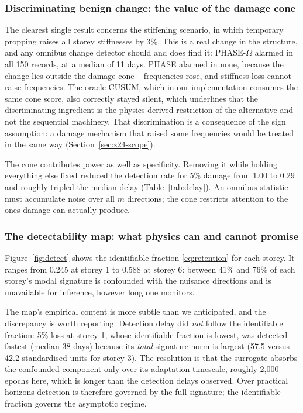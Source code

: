 \documentclass[12pt,a4paper]{article}
\newcommand{\rev}[1]{#1}
\newcommand{\rev}[1]{{\color{revcol}#1}}
\begin{document}
\subsubsection{Discriminating benign change: the value of the damage cone}\label{sec:res-cone}

The clearest single result concerns the stiffening scenario, in which temporary propping raises all storey stiffnesses by 3\%. This is a real change in the structure, and any omnibus change detector should and does find it: PHASE-$\Omega$ alarmed in all 150 records, at a median of 11 days. PHASE alarmed in none, because the change lies outside the damage cone -- frequencies rose, and stiffness loss cannot raise frequencies. The oracle CUSUM, which in our implementation consumes the same cone score, also correctly stayed silent, which underlines that the discriminating ingredient is the physics-derived restriction of the alternative and not the sequential machinery. \rev{That discrimination is a consequence of the sign assumption: a damage mechanism that raised some frequencies would be treated in the same way (Section~\ref{sec:z24-scope}).}

The cone contributes power as well as specificity. Removing it while holding everything else fixed reduced the detection rate for 5\% damage from 1.00 to 0.29 and roughly tripled the median delay (Table~\ref{tab:delay}). An omnibus statistic must accumulate noise over all $m$ directions; the cone restricts attention to the ones damage can actually produce.

\subsubsection{The detectability map: what physics can and cannot promise}\label{sec:res-detect}

Figure~\ref{fig:detect} shows the identifiable fraction \eqref{eq:retention} for each storey. It ranges from 0.245 at storey 1 to 0.588 at storey 6: between 41\% and 76\% of each storey's modal signature is confounded with the nuisance directions and is unavailable for inference, however long one monitors.

The map's empirical content is more subtle than we anticipated, and the discrepancy is worth reporting. Detection delay did \emph{not} follow the identifiable fraction: 5\% loss at storey 1, whose identifiable fraction is lowest, was detected fastest (median 38 days) because its \emph{total} signature norm is largest (57.5 versus 42.2 standardised units for storey 3). The resolution is that the surrogate absorbs the confounded component only over its adaptation timescale, roughly 2{,}000 epochs here, which is longer than the detection delays observed. Over practical horizons detection is therefore governed by the full signature; the identifiable fraction governs the asymptotic regime.
\end{document}
